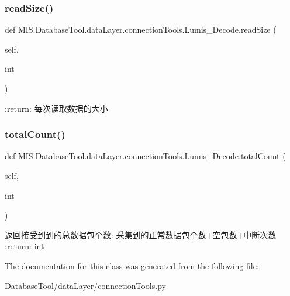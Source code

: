 \subsubsection{\texorpdfstring{read\+Size()}{readSize()}}
{\footnotesize\ttfamily def M\+I\+S.\+Database\+Tool.\+data\+Layer.\+connection\+Tools.\+Lumis\+\_\+\+Decode.\+read\+Size (\begin{DoxyParamCaption}\item[{}]{self,  }\item[{}]{int }\end{DoxyParamCaption})}

\begin{DoxyVerb}:return: 每次读取数据的大小
\end{DoxyVerb}
 \mbox{\label{classMIS_1_1DatabaseTool_1_1dataLayer_1_1connectionTools_1_1Lumis__Decode_a88bc70f8bd15c217eb8c2486f2788821}} 
\subsubsection{\texorpdfstring{total\+Count()}{totalCount()}}
{\footnotesize\ttfamily def M\+I\+S.\+Database\+Tool.\+data\+Layer.\+connection\+Tools.\+Lumis\+\_\+\+Decode.\+total\+Count (\begin{DoxyParamCaption}\item[{}]{self,  }\item[{}]{int }\end{DoxyParamCaption})}

\begin{DoxyVerb}返回接受到到的总数据包个数: 采集到的正常数据包个数+空包数+中断次数
:return: int
\end{DoxyVerb}
 

The documentation for this class was generated from the following file\+:\begin{DoxyCompactItemize}
\item 
Database\+Tool/data\+Layer/connection\+Tools.\+py\end{DoxyCompactItemize}
